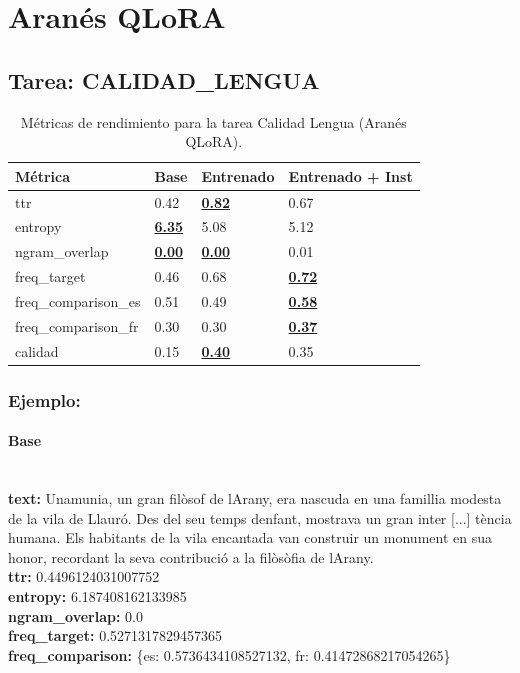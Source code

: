 \section{Aranés QLoRA}

\subsection{Tarea: CALIDAD\_LENGUA}\label{tarea-calidad_lengua}
\begin{longtable}[]{@{}llll@{}}
\toprule\noalign{}
Métrica & Base & Entrenado & Entrenado + Inst \\
\midrule\noalign{}
\endhead
\bottomrule\noalign{}
\caption{Métricas de rendimiento para la tarea Calidad Lengua (Aranés QLoRA).}
\label{tab:metricas_calidad_lengua_Aranés QLoRA}
\endlastfoot
ttr & 0.42 & \textbf{\underline{0.82}} & 0.67 \\
entropy & \textbf{\underline{6.35}} & 5.08 & 5.12 \\
ngram\_overlap & \textbf{\underline{0.00}} & \textbf{\underline{0.00}} & 0.01 \\
freq\_target & 0.46 & 0.68 & \textbf{\underline{0.72}} \\
freq\_comparison\_es & 0.51 & 0.49 & \textbf{\underline{0.58}} \\
freq\_comparison\_fr & 0.30 & 0.30 & \textbf{\underline{0.37}} \\
calidad & 0.15 & \textbf{\underline{0.40}} & 0.35 \\
\end{longtable}

\subsubsection{Ejemplo:}

\paragraph{Base}~\\
\textbf{text:} Unamunia, un gran filòsof de l\textquotesingle{}Arany, era nascuda en una famillia modesta de la vila de Llauró. Des del seu temps d\textquotesingle{}enfant, mostrava un gran inter [...] tència humana. Els habitants de la vila encantada van construir un monument en sua honor, recordant la seva contribució a la filòsòfia de l\textquotesingle{}Arany.\\
\textbf{ttr:} 0.4496124031007752\\
\textbf{entropy:} 6.187408162133985\\
\textbf{ngram\_overlap:} 0.0\\
\textbf{freq\_target:} 0.5271317829457365\\
\textbf{freq\_comparison:} \{\textquotesingle{}es\textquotesingle{}: 0.5736434108527132, \textquotesingle{}fr\textquotesingle{}: 0.41472868217054265\}


